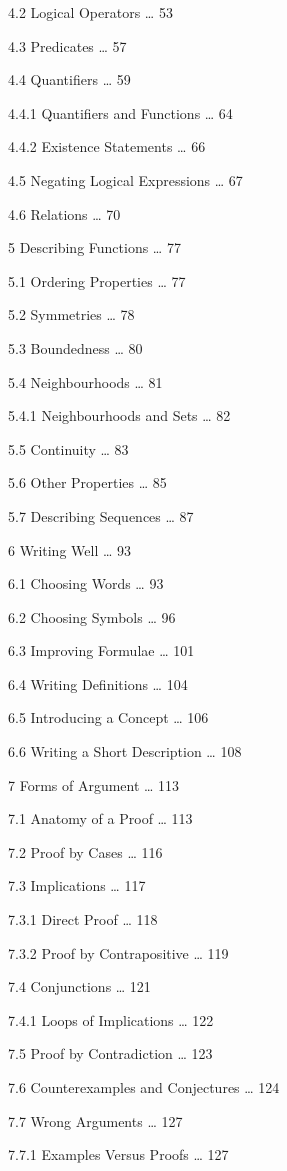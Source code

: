 \documentclass[11pt]{article}
\theoremstyle{plain}
\theoremstyle{definition}
\begin{document}
4.2 Logical Operators \dots{} 53

4.3 Predicates \dots{} 57

4.4 Quantifiers \dots{} 59

4.4.1 Quantifiers and Functions \dots{} 64

4.4.2 Existence Statements \dots{} 66

4.5 Negating Logical Expressions \dots{} 67

4.6 Relations \dots{} 70

5 Describing Functions \dots{} 77

5.1 Ordering Properties \dots{} 77

5.2 Symmetries \dots{} 78

5.3 Boundedness \dots{} 80

5.4 Neighbourhoods \dots{} 81

5.4.1 Neighbourhoods and Sets \dots{} 82

5.5 Continuity \dots{} 83

5.6 Other Properties \dots{} 85

5.7 Describing Sequences \dots{} 87

6 Writing Well \dots{} 93

6.1 Choosing Words \dots{} 93

6.2 Choosing Symbols \dots{} 96

6.3 Improving Formulae \dots{} 101

6.4 Writing Definitions \dots{} 104

6.5 Introducing a Concept \dots{} 106

6.6 Writing a Short Description \dots{} 108

7 Forms of Argument \dots{} 113

7.1 Anatomy of a Proof \dots{} 113

7.2 Proof by Cases \dots{} 116

7.3 Implications \dots{} 117

7.3.1 Direct Proof \dots{} 118

7.3.2 Proof by Contrapositive \dots{} 119

7.4 Conjunctions \dots{} 121

7.4.1 Loops of Implications \dots{} 122

7.5 Proof by Contradiction \dots{} 123

7.6 Counterexamples and Conjectures \dots{} 124

7.7 Wrong Arguments \dots{} 127

7.7.1 Examples Versus Proofs \dots{} 127
\end{document}

